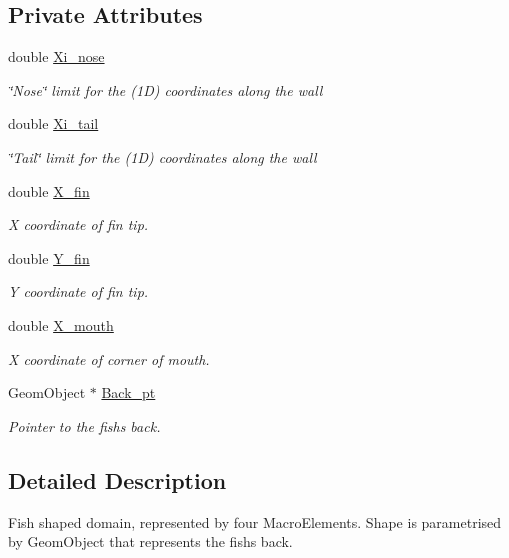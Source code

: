 \subsection*{Private Attributes}
\begin{DoxyCompactItemize}
\item 
double \hyperlink{classoomph_1_1FishDomain_af85c4be86bb87528939778e3f63a40a5}{Xi\+\_\+nose}
\begin{DoxyCompactList}\small\item\em \char`\"{}\+Nose\char`\"{} limit for the (1D) coordinates along the wall \end{DoxyCompactList}\item 
double \hyperlink{classoomph_1_1FishDomain_a38633d4f3e2777be9544b907d1de5870}{Xi\+\_\+tail}
\begin{DoxyCompactList}\small\item\em \char`\"{}\+Tail\char`\"{} limit for the (1D) coordinates along the wall \end{DoxyCompactList}\item 
double \hyperlink{classoomph_1_1FishDomain_af27c51fe0272df3dec2ad93c5c231d59}{X\+\_\+fin}
\begin{DoxyCompactList}\small\item\em X coordinate of fin tip. \end{DoxyCompactList}\item 
double \hyperlink{classoomph_1_1FishDomain_a162b4a35d8d0e986d254651571844253}{Y\+\_\+fin}
\begin{DoxyCompactList}\small\item\em Y coordinate of fin tip. \end{DoxyCompactList}\item 
double \hyperlink{classoomph_1_1FishDomain_aa25f3280c2453dd725d59f23a478ee11}{X\+\_\+mouth}
\begin{DoxyCompactList}\small\item\em X coordinate of corner of mouth. \end{DoxyCompactList}\item 
Geom\+Object $\ast$ \hyperlink{classoomph_1_1FishDomain_ae943e7fe48ce09dded2d5351ab980f93}{Back\+\_\+pt}
\begin{DoxyCompactList}\small\item\em Pointer to the fish\textquotesingle{}s back. \end{DoxyCompactList}\end{DoxyCompactItemize}


\subsection{Detailed Description}
Fish shaped domain, represented by four Macro\+Elements. Shape is parametrised by Geom\+Object that represents the fish\textquotesingle{}s back. 


